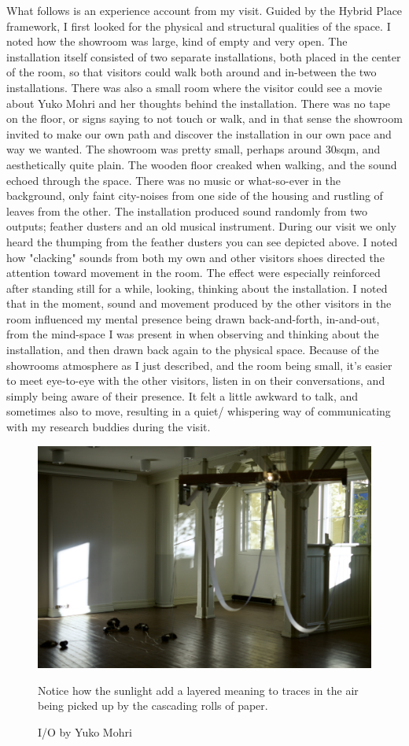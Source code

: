 What follows is an experience account from my visit. Guided by the Hybrid Place framework, I first looked for the physical and structural qualities of the space. I noted how the showroom was large, kind of empty and very open. The installation itself consisted of two separate installations, both placed in the center of the room, so that visitors could walk both around and in-between the two installations. There was also a small room where the visitor could see a movie about Yuko Mohri and her thoughts behind the installation. There was no tape on the floor, or signs saying to not touch or walk, and in that sense the showroom invited to make our own path and discover the installation in our own pace and way we wanted. The showroom was pretty small, perhaps around 30sqm, and aesthetically quite plain. The wooden floor creaked when walking, and the sound echoed through the space. There was no music or what-so-ever in the background, only faint city-noises from one side of the housing and rustling of leaves from the other. The installation produced sound randomly from two outputs; feather dusters and an old musical instrument. During our visit we only heard the thumping from the feather dusters you can see depicted above. I noted how "clacking" sounds from both my own and other visitors shoes directed the attention toward movement in the room. The effect were especially reinforced after standing still for a while, looking, thinking about the installation. I noted that in the moment, sound and movement produced by the other visitors in the room influenced my mental presence being drawn back-and-forth, in-and-out, from the mind-space I was present in when observing and thinking about the installation, and then drawn back again to the physical space. Because of the showrooms atmosphere as I just described, and the room being small, it's easier to meet eye-to-eye with the other visitors, listen in on their conversations, and simply being aware of their presence. It felt a little awkward to talk, and sometimes also to move, resulting in a quiet/ whispering way of communicating with my research buddies during the visit.

\begin{figure}[H]
    \centering 
    \includegraphics[width=12cm]{pictures/process/yuko_harmony.jpeg}
    \caption{I/O by Yuko Mohri}{Notice how the sunlight add a layered meaning to traces in the air being picked up by the cascading rolls of paper.}
\end{figure}

